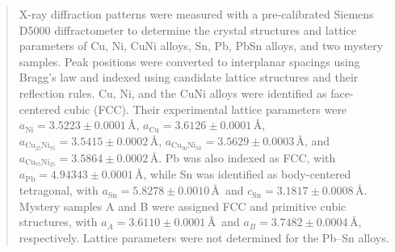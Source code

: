 \documentclass[12pt]{article}
\begin{document}
\begin{abstract}



X-ray diffraction patterns were measured with a pre-calibrated Siemens D5000 diffractometer to determine the crystal structures
and lattice parameters of Cu, Ni, CuNi alloys, Sn, Pb, PbSn alloys, and two mystery samples. Peak positions were converted to
interplanar spacings using Bragg's law and indexed using candidate lattice structures and their reflection rules. Cu, Ni, and the
CuNi alloys were identified as face-centered cubic (FCC). Their experimental lattice parameters were $a_{\mathrm{Ni}}=3.5223\pm0.0001$\,\AA,
$a_{\mathrm{Cu}}=3.6126\pm0.0001$\,\AA, $a_{\mathrm{Cu_{25}Ni_{75}}}=3.5415\pm0.0002$\,\AA, $a_{\mathrm{Cu_{50}Ni_{50}}}=3.5629\pm0.0003$\,\AA,
and $a_{\mathrm{Cu_{75}Ni_{25}}}=3.5864\pm0.0002$\,\AA. Pb was also indexed as FCC, with $a_{\mathrm{Pb}}=4.94343\pm0.0001$\,\AA, while Sn was
identified as body-centered tetragonal, with $a_{\mathrm{Sn}}=5.8278\pm0.0010$\,\AA\ and $c_{\mathrm{Sn}}=3.1817\pm0.0008$\,\AA. Mystery samples
A and B were assigned FCC and primitive cubic structures, with $a_A=3.6110\pm0.0001$\,\AA\ and $a_B=3.7482\pm0.0004$\,\AA, respectively.
Lattice parameters were not determined for the Pb--Sn alloys.





\end{abstract}
\end{document}
